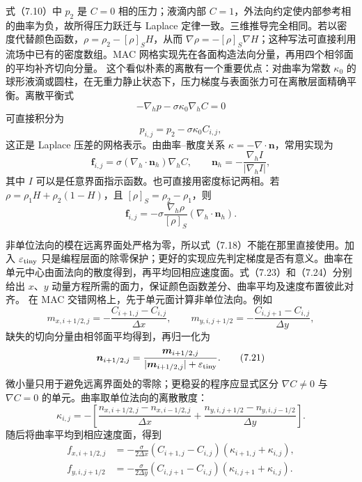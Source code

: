 \documentclass[11pt,a4paper,openany,fontset=none]{ctexbook}
\begin{document}
式（7.10）中 $p_2$ 是 $C=0$ 相的压力；液滴内部 $C=1$，外法向约定使内部参考相的曲率为负，故所得压力跃迁与 Laplace 定律一致。三维推导完全相同。若以密度代替颜色函数，$\rho=\rho_2-[\rho]_SH$，从而 $\nabla\rho=-[\rho]_S\nabla H$；这种写法可直接利用流场中已有的密度数组。MAC 网格实现先在各面构造法向分量，再用四个相邻面的平均补齐切向分量。
这个看似朴素的离散有一个重要优点：对曲率为常数 $\kappa_0$ 的球形液滴或圆柱，在无重力静止状态下，压力梯度与表面张力可在离散层面精确平衡。离散平衡式
\begin{equation}
  -\nabla_hp-\sigma\kappa_0\nabla_hC=0
  \tag{7.7}
\end{equation}
可直接积分为
\begin{equation}
  p_{i,j}=p_2-\sigma\kappa_0 C_{i,j},
  \tag{7.10}
\end{equation}
这正是 Laplace 压差的网格表示。由曲率--散度关系 $\kappa=-\nabla\cdot\boldsymbol n$，常用实现为
\begin{equation}
  \boldsymbol f_{i,j}=\sigma(\nabla_h\cdot\boldsymbol n_h)\nabla_hC,
  \qquad
  \boldsymbol n_h=-\frac{\nabla_h I}{|\nabla_h I|},
  \tag{7.11--7.12}
\end{equation}
其中 $I$ 可以是任意界面指示函数。也可直接用密度标记两相。若
$\rho=\rho_1H+\rho_2(1-H)$，且 $[\rho]_S=\rho_2-\rho_1$，则
\begin{equation}
  \boldsymbol f_{i,j}
  =-\sigma\frac{\nabla_h\rho}{[\rho]_S}
  (\nabla_h\cdot\boldsymbol n_h).
  \tag{7.15}
\end{equation}

非单位法向的模在远离界面处严格为零，所以式（7.18）不能在那里直接使用。加入 $\varepsilon_{\rm tiny}$ 只是编程层面的除零保护；更好的实现应先判定梯度是否有意义。曲率在单元中心由面法向的散度得到，再平均回相应速度面。式（7.23）和（7.24）分别给出 $x$、$y$ 动量方程所需的面力，保证颜色函数差分、曲率平均及速度布置彼此对齐。
在 MAC 交错网格上，先于单元面计算非单位法向。例如
\begin{equation}
 m_{x,i+1/2,j}=-\frac{C_{i+1,j}-C_{i,j}}{\Delta x},
 \qquad
 m_{y,i,j+1/2}=-\frac{C_{i,j+1}-C_{i,j}}{\Delta y},
 \tag{7.16}
\end{equation}
缺失的切向分量由相邻面平均得到，再归一化为
\begin{equation}
  \boldsymbol n_{i+1/2,j}
  =\frac{\boldsymbol m_{i+1/2,j}}
  {|\boldsymbol m_{i+1/2,j}|+\varepsilon_{\rm tiny}}.
  \tag{7.21}
\end{equation}
微小量只用于避免远离界面处的零除；更稳妥的程序应显式区分 $\nabla C\ne0$ 与 $\nabla C=0$ 的单元。曲率取单位法向的离散散度：
\begin{equation}
 \kappa_{i,j}=-\left[
 \frac{n_{x,i+1/2,j}-n_{x,i-1/2,j}}{\Delta x}
 +\frac{n_{y,i,j+1/2}-n_{y,i,j-1/2}}{\Delta y}
 \right].
 \tag{7.22}
\end{equation}
随后将曲率平均到相应速度面，得到
\begin{align}
 f_{x,i+1/2,j}&=-\frac{\sigma}{2\Delta x}
 (C_{i+1,j}-C_{i,j})(\kappa_{i+1,j}+\kappa_{i,j}),\\
 f_{y,i,j+1/2}&=-\frac{\sigma}{2\Delta y}
 (C_{i,j+1}-C_{i,j})(\kappa_{i,j+1}+\kappa_{i,j}).
 \tag{7.23--7.24}
\end{align}
\end{document}
